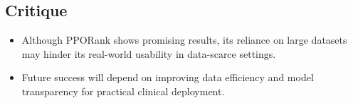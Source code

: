 \subsection*{Critique}
\begin{itemize}
    \item Although PPORank shows promising results, its reliance on large datasets may hinder its real-world usability in data-scarce settings.
    \item Future success will depend on improving data efficiency and model transparency for practical clinical deployment.
\end{itemize}
